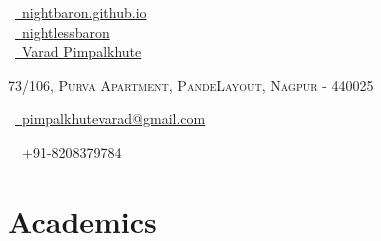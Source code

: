 \documentclass[a4paper,10pt]{extarticle} %
\begin{document}
\pagestyle{empty} %


\begin{multicols}{3}
\normalsize  \faGlobe\ {\href{https://nightbaron.github.io/}{\  nightbaron.github.io}}\\
\normalsize \faGithub\ {\href{https://github.com/nightlessbaron}{\  nightlessbaron}}\\
\normalsize  \faLinkedinSquare\ {\href{https://www.linkedin.com/in/varad-pimpalkhute-a526a9167/}{\  Varad Pimpalkhute}}\\
\columnbreak
\normalsize\par{\centering{\huge\textsc{\textcolor{primary}{Varad Pimpalkhute}}}\par} %
\par{\centering\normalsize {\textsc{73/106, Purva Apartment, PandeLayout, Nagpur - 440025}}\hfill\par}
\columnbreak
\raggedright\hfill\normalsize \faEnvelope\ {\href{mailto:pimpalkhutevarad@gmail.com}{\  pimpalkhutevarad@gmail.com}}\\
\raggedright\hfill{\faPhone\ \  +91-8208379784}
\end{multicols}


\vspace{-0.6cm}
\section{\textcolor{primary}{Academics}}
\end{document}
